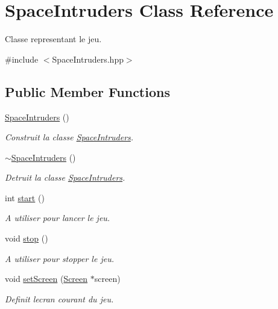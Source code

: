 \hypertarget{class_space_intruders}{}\section{Space\+Intruders Class Reference}
\label{class_space_intruders}


Classe representant le jeu.  




{\ttfamily \#include $<$Space\+Intruders.\+hpp$>$}

\subsection*{Public Member Functions}
\begin{DoxyCompactItemize}
\item 
\hyperlink{class_space_intruders_a7c53c28b660bb22a9433112768ded3ae}{Space\+Intruders} ()
\begin{DoxyCompactList}\small\item\em Construit la classe \hyperlink{class_space_intruders}{Space\+Intruders}. \end{DoxyCompactList}\item 
\hyperlink{class_space_intruders_a55184ccc75ec89b388b21d386f12fe07}{$\sim$\+Space\+Intruders} ()
\begin{DoxyCompactList}\small\item\em Detruit la classe \hyperlink{class_space_intruders}{Space\+Intruders}. \end{DoxyCompactList}\item 
int \hyperlink{class_space_intruders_a41016bf86ebd323141c427cb294fba44}{start} ()
\begin{DoxyCompactList}\small\item\em A utiliser pour lancer le jeu. \end{DoxyCompactList}\item 
void \hyperlink{class_space_intruders_afbdfd16308c83b984dba596c14c35203}{stop} ()
\begin{DoxyCompactList}\small\item\em A utiliser pour stopper le jeu. \end{DoxyCompactList}\item 
void \hyperlink{class_space_intruders_a6ed0614ff6dbdff01aff4d7512510148}{set\+Screen} (\hyperlink{class_screen}{Screen} $\ast$screen)
\begin{DoxyCompactList}\small\item\em Definit l\textquotesingle{}ecran courant du jeu. \end{DoxyCompactList}\item 

\end{DoxyCompactItemize}
